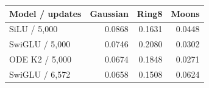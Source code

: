\begin{tabular}{lrrr}
\toprule
Model / updates & Gaussian & Ring8 & Moons \\
\midrule
SiLU / 5,000 & 0.0868 & 0.1631 & 0.0448 \\
SwiGLU / 5,000 & 0.0746 & 0.2080 & 0.0302 \\
ODE K2 / 5,000 & 0.0674 & 0.1848 & 0.0271 \\
SwiGLU / 6,572 & 0.0658 & 0.1508 & 0.0624 \\
\bottomrule
\end{tabular}
